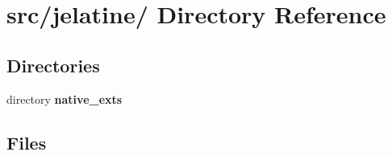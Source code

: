 \section{src/jelatine/ Directory Reference}
\label{dir_b9783747b5a8d8159dded18239e3919b}
\subsection*{Directories}
\begin{DoxyCompactItemize}
\item 
directory {\bf native\_\-exts}
\end{DoxyCompactItemize}
\subsection*{Files}
